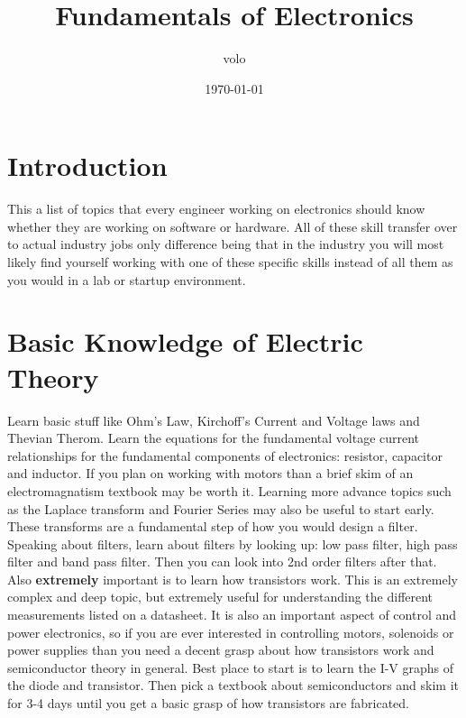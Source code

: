 \documentclass[11pt]{article}
\author{volo}
\date{\today}
\title{Fundamentals of Electronics}
\begin{document}
\maketitle
\tableofcontents

\section{Introduction}
\label{sec:org10f1be3}
This a list of topics that every engineer working on electronics should know whether they are
working on software or hardware. All of these skill transfer over to actual industry jobs only
difference being that in the industry you will most likely find yourself working with one of these
specific skills instead of all them as you would in a lab or startup environment.
\section{Basic Knowledge of Electric Theory}
\label{sec:orgc7c480d}
Learn basic stuff like Ohm's Law, Kirchoff's Current and Voltage laws and Thevian Therom. Learn
the equations for the fundamental voltage current relationships for the fundamental components of
electronics: resistor, capacitor and inductor. If you plan on working with motors than a brief skim
of an electromagnatism textbook may be worth it. Learning more advance topics such as the Laplace
transform and Fourier Series may also be useful to start early. These transforms are a fundamental
step of how you would design a filter. Speaking about filters, learn about filters by looking up:
low pass filter, high pass filter and band pass filter. Then you can look into 2nd order filters
after that. Also \textbf{extremely} important is to learn how transistors work. This is an extremely
complex and deep topic, but extremely useful for understanding the different measurements listed on
a datasheet. It is also an important aspect of control and power electronics, so if you are ever
interested in controlling motors, solenoids or power supplies than you need a decent grasp about
how transistors work and semiconductor theory in general. Best place to start is to learn the I-V
graphs of the diode and transistor. Then pick a textbook about semiconductors and skim it for 3-4
days until you get a basic grasp of how transistors are fabricated.
\end{document}
